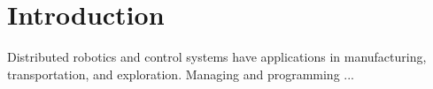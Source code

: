 \section{Introduction}
Distributed robotics and control systems have applications in manufacturing, transportation, and exploration. Managing and programming ...


